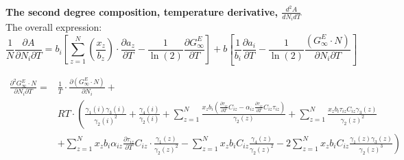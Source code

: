 \documentclass[a4paper, 12pt, english, sintefheadings, sintefcolour]{sintefmemo}
\begin{document}
\noindent\hrulefill\\

\textbf{The second degree composition, temperature derivative, $\frac{d^2A}{dN_idT}$}\\

The overall expression:
\begin{equation}
\frac{1}{N}\frac{\partial A}{\partial N_i \partial T}=b_i\left[\sum_{z=1}^N\left(\frac{x_z}{b_z}\right)\cdot\frac{\partial a_z}{\partial T}-\frac{1}{\ln{(2)}}\frac{\partial G_{\infty}^E}{\partial T}\right]+b\left[\frac{1}{b_i}\frac{\partial a_i}{\partial T}-\frac{1}{\ln{(2)}}\frac{(G_{\infty}^E\cdot N)}{\partial N_i \partial T}\right]
\end{equation}

\begin{equation}
\begin{split}
\frac{\partial^2 G_{\infty}^E \cdot N}{\partial N_i \partial T}=&\frac{1}{T}\cdot\frac{\partial (G_{\infty}^E\cdot N)}{\partial N_i}+ \\
&RT\cdot\left(\frac{\gamma_1(i)\gamma_3(i)}{\gamma_2(i)^2}+\frac{\gamma_4(i)}{\gamma_2(i)}+\sum_{z=1}^N\frac{x_zb_i\left(\frac{\partial \tau_{iz}}{\partial T}C_{iz}-\alpha_{iz}\frac{\partial \tau_{iz}}{\partial T}C_{iz}\tau_{iz}\right)}{\gamma_2(z)}+\sum_{z=1}^N\frac{x_zb_i\tau_{iz}C_{iz}\gamma_3(z)}{\gamma_2(z)^2}\right. \\
&\left.+\sum_{z=1}^N x_zb_i\alpha_{iz}\frac{\partial \tau_{iz}}{\partial T}C_{iz}\cdot\frac{\gamma_1(z)}{\gamma_2(z)^2}-\sum_{z=1}^N x_zb_iC_{iz}\frac{\gamma_4(z)}{\gamma_2(z)^2}-2\sum_{z=1}^N x_zb_iC_{iz}\frac{\gamma_1(z)\gamma_3(z)}{\gamma_2(z)^3} \right)
\end{split}
\end{equation}

\newpage
\end{document}
